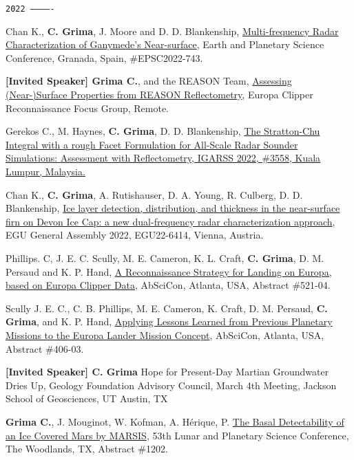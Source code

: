 \begin{etaremune}
\hspace{-2em}\texttt{2022 -------------}

\item
  Chan K., \textbf{C. Grima}, J. Moore and D. D. Blankenship, \href{https://meetingorganizer.copernicus.org/EPSC2022/EPSC2022-743.html?pdf}{Multi-frequency Radar Characterization of Ganymede's Near-surface}, Earth and Planetary Science Conference, Granada, Spain, \#EPSC2022-743. 
\item
  \textbf{[Invited Speaker] Grima C.}, and the REASON Team, \href{}{Assessing (Near-)Surface Properties from REASON Reflectometry}, Europa Clipper Reconnaissance Focus Group, Remote.
\item
  Gerekos C., M. Haynes, \textbf{C. Grima}, D. D. Blankenship, \href{https://www.igarss2022.org/view_paper.php?PaperNum=3558}{The Stratton-Chu Integral with a rough Facet Formulation for All-Scale Radar Sounder Simulations: Assessment with Reflectometry, IGARSS 2022, \#3558, Kuala Lumpur, Malaysia.}
\item
  Chan K., \textbf{C. Grima}, A. Rutishauser, D. A. Young, R. Culberg, D. D. Blankenship, \href{https://meetingorganizer.copernicus.org/EGU22/EGU22-6414.html}{Ice layer detection, distribution, and thickness in the near-surface firn on Devon Ice Cap: a new dual-frequency radar characterization approach}, EGU General Assembly 2022, EGU22-6414, Vienna, Austria.
\item
  Phillips. C, J. E. C. Scully, M. E. Cameron, K. L. Craft, \textbf{C. Grima}, D. M. Persaud and K. P. Hand, \href{https://agu.confex.com/data/extendedabstract/agu/abscicon21/Paper_1028516_extendedabstract_91715_0.pdf}{A Reconnaissance Strategy for Landing on Europa, based on Europa Clipper Data}, AbSciCon, Atlanta, USA, Abstract \#521-04.
\item
  Scully J. E. C., C. B. Phillips, M. E. Cameron, K. Craft, D. M. Persaud, \textbf{C. Grima}, and K. P. Hand, \href{https://agu.confex.com/data/extendedabstract/agu/abscicon21/Paper_1029989_extendedabstract_90435_0.pdf}{Applying Lessons Learned from Previous Planetary Missions to the Europa Lander Mission Concept}, AbSciCon, Atlanta, USA, Abstract \#406-03.
\item
  \textbf{[Invited Speaker] C. Grima} Hope for Present-Day Martian Groundwater Dries Up, Geology Foundation Advisory Council, March 4th Meeting, Jackson School of Geosciences, UT Austin, TX
\item
  \textbf{Grima C.}, J. Mouginot, W. Kofman, A. Hérique, P. \href{https://www.hou.usra.edu/meetings/lpsc2022/pdf/1202.pdf}{The Basal Detectability of an Ice Covered Mars by MARSIS}, 53th Lunar and Planetary Science Conference, The Woodlands, TX, Abstract \#1202.

\end{etaremune}
